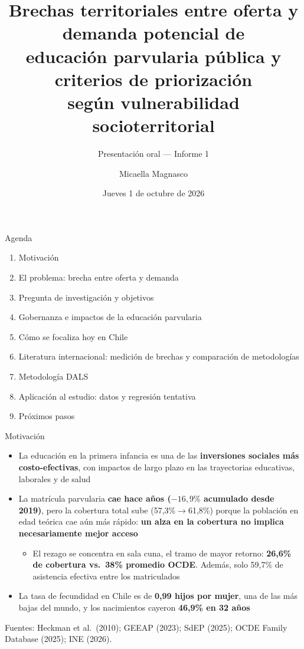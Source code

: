 \documentclass[aspectratio=169,10pt]{beamer}
\title{Brechas territoriales entre oferta y demanda potencial de\\ educación parvularia pública y criterios de priorización\\ según vulnerabilidad socioterritorial}
\subtitle{Presentación oral --- Informe 1}
\author{Micaella Magnasco}
\institute{Desafíos de la Economía Aplicada\\ Profesora: Francisca Moreno \quad Ayudante: María Maceiras}
\date{Jueves 1 de octubre de 2026}
\newcommand{\fuentes}[1]{%
  \vfill{\color{graytext}\scriptsize Fuentes: #1.}%
}
\newcommand{\destacar}[1]{\textcolor{steel}{\textbf{#1}}}
\begin{document}
\begin{frame}[plain]
  \titlepage
\end{frame}

\begin{frame}{Agenda}
  \begin{enumerate}
    \item Motivación
    \item El problema: brecha entre oferta y demanda
    \item Pregunta de investigación y objetivos
    \item Gobernanza e impactos de la educación parvularia
    \item Cómo se focaliza hoy en Chile
    \item Literatura internacional: medición de brechas y comparación de metodologías
    \item Metodología DALS
    \item Aplicación al estudio: datos y regresión tentativa
    \item Próximos pasos
  \end{enumerate}
\end{frame}

\begin{frame}{Motivación}
  \small
  \begin{itemize}
    \item La educación en la primera infancia es una de las \destacar{inversiones sociales más costo-efectivas}, con impactos de largo plazo en las trayectorias educativas, laborales y de salud
    \item La matrícula parvularia \destacar{cae hace años ($-16,9\%$ acumulado desde 2019)}, pero la cobertura total sube (57,3\%$\to$61,8\%) porque la población en edad teórica cae aún más rápido: \destacar{un alza en la cobertura no implica necesariamente mejor acceso}
      \begin{itemize}
        \item El rezago se concentra en sala cuna, el tramo de mayor retorno: \destacar{26,6\% de cobertura vs.\ 38\% promedio OCDE}. Además, solo 59,7\% de asistencia efectiva entre los matriculados
      \end{itemize}
    \item La tasa de fecundidad en Chile es de \destacar{0,99 hijos por mujer}, una de las más bajas del mundo, y los nacimientos cayeron \destacar{46,9\% en 32 años}
  \end{itemize}
  \fuentes{Heckman et al.\ (2010); GEEAP (2023); SdEP (2025); OCDE Family Database (2025); INE (2026)}
\end{frame}
\end{document}
